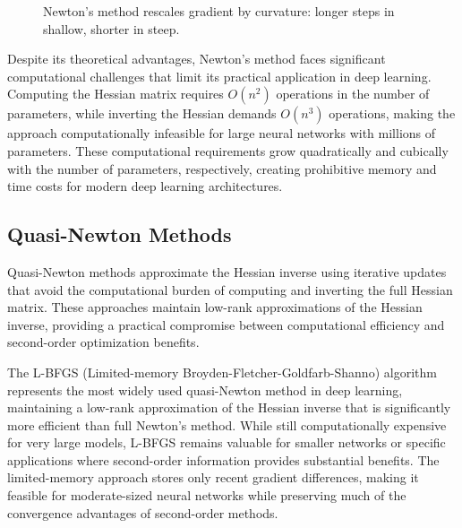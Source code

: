 \begin{figure}[h]
\centering
{}
\caption{Newton's method rescales gradient by curvature: longer steps in shallow, shorter in steep.}
\label{fig:newton-bowl}
\end{figure}

Despite its theoretical advantages, Newton's method faces significant computational challenges that limit its practical application in deep learning. Computing the Hessian matrix requires $O(n^2)$ operations in the number of parameters, while inverting the Hessian demands $O(n^3)$ operations, making the approach computationally infeasible for large neural networks with millions of parameters. These computational requirements grow quadratically and cubically with the number of parameters, respectively, creating prohibitive memory and time costs for modern deep learning architectures.

\subsection{Quasi-Newton Methods}

Quasi-Newton methods approximate the Hessian inverse using iterative updates that avoid the computational burden of computing and inverting the full Hessian matrix. These approaches maintain low-rank approximations of the Hessian inverse, providing a practical compromise between computational efficiency and second-order optimization benefits.

The L-BFGS (Limited-memory Broyden-Fletcher-Goldfarb-Shanno) algorithm represents the most widely used quasi-Newton method in deep learning, maintaining a low-rank approximation of the Hessian inverse that is significantly more efficient than full Newton's method. While still computationally expensive for very large models, L-BFGS remains valuable for smaller networks or specific applications where second-order information provides substantial benefits. The limited-memory approach stores only recent gradient differences, making it feasible for moderate-sized neural networks while preserving much of the convergence advantages of second-order methods.

